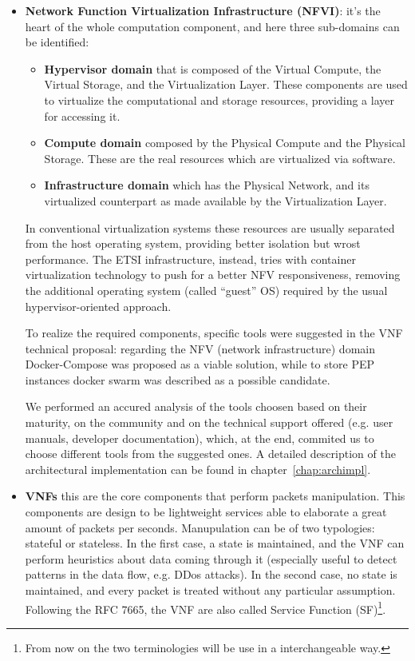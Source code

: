 \begin{itemize}
 \item \textbf{Network Function Virtualization Infrastructure (NFVI)}: it's the
   heart of the whole computation component, and here three sub-domains can be
   identified: 
\begin{itemize} 
 \item \textbf{Hypervisor domain} that is composed of the Virtual Compute, the
   Virtual Storage, and the Virtualization Layer. These components are used to
   virtualize the computational and storage resources, providing a layer for
   accessing it.
 \item \textbf{Compute domain} composed by the Physical Compute and the Physical
   Storage. These are the real resources which are virtualized via software.
 \item \textbf{Infrastructure domain} which has the Physical Network, and its
   virtualized counterpart as made available by the Virtualization Layer.
\end{itemize}

In conventional virtualization systems these resources are usually separated
from the host operating system, providing better isolation but wrost
performance. The ETSI infrastructure, instead, tries with container
virtualization technology to push for a better NFV responsiveness, removing the additional operating
system (called ``guest'' OS) required by the usual hypervisor-oriented approach.

To realize the required components, specific tools were suggested in the VNF
technical proposal: regarding the NFV (network infrastructure) domain
Docker-Compose was proposed as a viable solution, while to store PEP instances
docker swarm was described as a possible candidate.

We performed an accured analysis of the tools choosen based on their maturity,
on the community and on the technical support offered (e.g. user manuals,
developer documentation), which, at the end, commited us to choose different
tools from the suggested ones. A detailed description of the architectural
implementation can be found in chapter~\ref{chap:archimpl}.

\item \textbf{VNFs} this are the core components that perform packets
  manipulation. This components are design to be lightweight services able to
  elaborate a great amount of packets per seconds. Manupulation can be of two
  typologies: stateful or stateless. In the first case, a state is maintained,
  and the VNF can perform heuristics about data coming through it (especially
  useful to detect patterns in the data flow, e.g. DDos attacks). In the second
  case, no state is maintained, and every packet is treated without any
  particular assumption. Following the RFC 7665, the VNF are also called Service
  Function (SF)\footnote{From now on the two terminologies will be use in a
    interchangeable way.}. 


\end{itemize}
